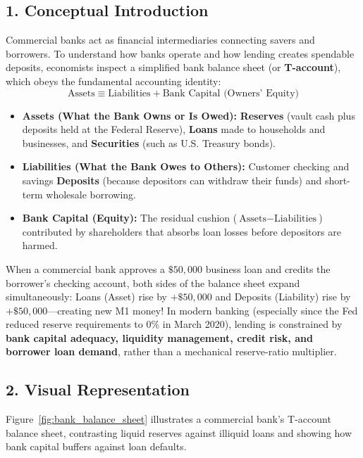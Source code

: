 \documentclass[11pt,letterpaper]{article}
\begin{document}
\subsection*{1. Conceptual Introduction}
Commercial banks act as financial intermediaries connecting savers and borrowers. To understand how banks operate and how lending creates spendable deposits, economists inspect a simplified bank balance sheet (or \textbf{T-account}), which obeys the fundamental accounting identity:
\begin{equation}
\text{Assets} \equiv \text{Liabilities} + \text{Bank Capital (Owners' Equity)}
\end{equation}
\begin{itemize}
    \item \textbf{Assets (What the Bank Owns or Is Owed):} \textbf{Reserves} (vault cash plus deposits held at the Federal Reserve), \textbf{Loans} made to households and businesses, and \textbf{Securities} (such as U.S. Treasury bonds).
    \item \textbf{Liabilities (What the Bank Owes to Others):} Customer checking and savings \textbf{Deposits} (because depositors can withdraw their funds) and short-term wholesale borrowing.
    \item \textbf{Bank Capital (Equity):} The residual cushion ($\text{Assets} - \text{Liabilities}$) contributed by shareholders that absorbs loan losses before depositors are harmed.
\end{itemize}

When a commercial bank approves a $\$50{,}000$ business loan and credits the borrower's checking account, both sides of the balance sheet expand simultaneously: Loans (Asset) rise by $+\$50{,}000$ and Deposits (Liability) rise by $+\$50{,}000$—creating new M1 money! In modern banking (especially since the Fed reduced reserve requirements to $0\%$ in March 2020), lending is constrained by \textbf{bank capital adequacy, liquidity management, credit risk, and borrower loan demand}, rather than a mechanical reserve-ratio multiplier.

\subsection*{2. Visual Representation}
Figure~\ref{fig:bank_balance_sheet} illustrates a commercial bank's T-account balance sheet, contrasting liquid reserves against illiquid loans and showing how bank capital buffers against loan defaults.
\end{document}
